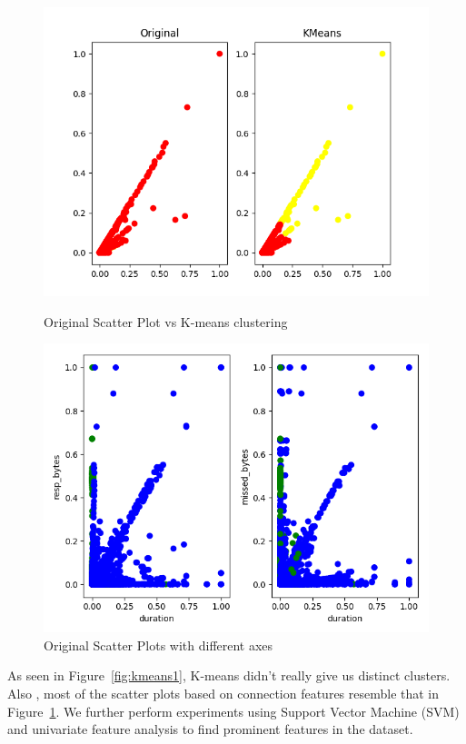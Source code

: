 \begin{figure}[htb]
	\centering
	\includegraphics[width=1\textwidth]{images/kmeans.png}
	\caption{Original Scatter Plot vs K-means clustering} 
	\label{fig:kmeans1}
	
	\centering
	\includegraphics[width=1\textwidth]{images/kmeans2.png}
	\caption{Original Scatter Plots with different axes} 
	\label{fig:kmeans2}
\end{figure}

As seen in Figure~\ref{fig:kmeans1}, K-means didn't really give us distinct clusters. Also , most of the scatter plots based on connection features resemble that in Figure~\ref{fig:kmeans2}. We further perform experiments using Support Vector Machine (SVM) and univariate feature analysis to find prominent features in the dataset.

